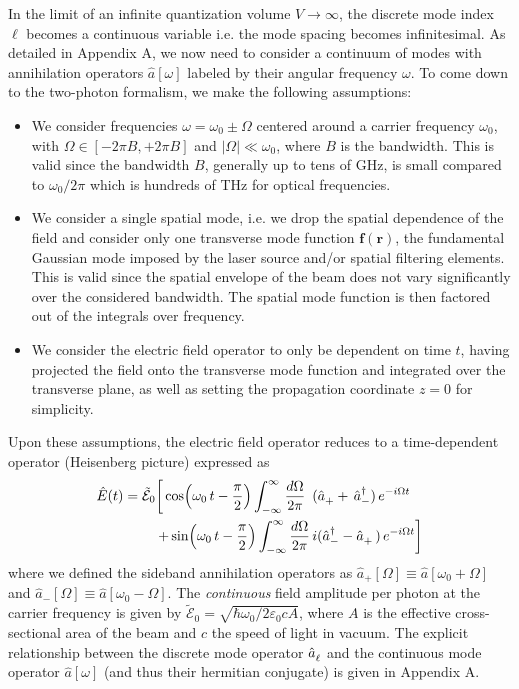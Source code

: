 In the limit of an infinite quantization volume $V \to \infty$, the discrete mode index $\ell$ becomes a continuous variable i.e. the mode spacing becomes infinitesimal. As detailed in Appendix A, we now need to consider a continuum of modes with annihilation operators $\hat a[\omega]$ labeled by their angular frequency $\omega$. To come down to the two-photon formalism, we make the following assumptions:
\begin{itemize}
    \item We consider frequencies $\omega = \omega_0 \pm \Omega$ centered around a carrier frequency $\omega_0$, with $\Omega  \in [-2 \pi B,+2 \pi B]$ and $ |\Omega| \ll \omega_0$, where $B$ is the bandwidth. This is valid since the bandwidth $B$, generally up to tens of GHz, is small compared to $\omega_0/2\pi$ which is hundreds of THz for optical frequencies. 
    \item We consider a single spatial mode, i.e. we drop the spatial dependence of the field and consider only one transverse mode function $\mathbf{f}(\mathbf{r})$, the fundamental Gaussian mode imposed by the laser source and/or spatial filtering elements. This is valid since the spatial envelope of the beam does not vary significantly over the considered bandwidth. The spatial mode function is then factored out of the integrals over frequency.
    \item We consider the electric field operator to only be dependent on time $t$, having projected the field onto the transverse mode function and integrated over the transverse plane, as well as setting the propagation coordinate $z=0$ for simplicity.
\end{itemize}

Upon these assumptions, the electric field operator reduces to a time-dependent operator (Heisenberg picture) expressed as \cite{Oelker2016PhD,Whittle2023PhD} 
\begin{equation}
  \begin{split}
   \hat{E}(t) =  \tilde{\mathcal{E}}_0 \bigg[ \cos ( \omega_0 \, t - \frac{\pi}{2} )   \int^{\infty}_{-\infty} \dfrac{d\Omega}{2\pi} \, \ & (\hat{a}_+^{\vphantom{\dagger}} + \, \hat{a}_-^{\dagger})\,e^{-i\Omega t}   \\ 
    +  \sin ( \omega_0 \, t - \frac{\pi}{2} )   \int^{\infty}_{-\infty} \dfrac{d\Omega}{2\pi} \, & i(\hat{a}_-^{\dagger} - \hat{a}_+^{\vphantom{\dagger}}  \, )\,e^{-i\Omega t} \bigg] 
  \end{split}
\end{equation}
where we defined the sideband annihilation operators as $\hat{a}_+[\Omega] \equiv \hat{a}[\omega_0 + \Omega]$ and $\hat{a}_-[\Omega] \equiv \hat{a}[\omega_0 - \Omega]$. The \textit{continuous} field amplitude per photon at the carrier frequency is given by $\tilde{\mathcal{E}}_0 = \sqrt{\hbar \omega_0/2 \varepsilon_0 c A}$, where $A$ is the effective cross-sectional area of the beam and $c$ the speed of light in vacuum. The explicit relationship between the discrete mode operator $\hat a_\ell^{\vphantom{\dagger}}$ and the continuous mode operator $\hat a[\omega]$ (and thus their hermitian conjugate) is given in Appendix A. \\ 

